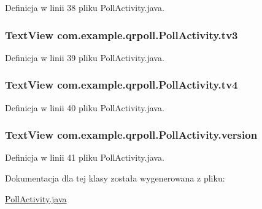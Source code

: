 Definicja w linii 38 pliku Poll\+Activity.\+java.

\hypertarget{classcom_1_1example_1_1qrpoll_1_1_poll_activity_a70708751ea7eb8a32569447a087471b8}{
\subsubsection[{tv3}]{\setlength{\rightskip}{0pt plus 5cm}Text\+View com.\+example.\+qrpoll.\+Poll\+Activity.\+tv3\hspace{0.3cm}{\ttfamily [private]}}}\label{classcom_1_1example_1_1qrpoll_1_1_poll_activity_a70708751ea7eb8a32569447a087471b8}


Definicja w linii 39 pliku Poll\+Activity.\+java.

\hypertarget{classcom_1_1example_1_1qrpoll_1_1_poll_activity_a32c7797e7d6cdf269f9449cfdb635438}{
\subsubsection[{tv4}]{\setlength{\rightskip}{0pt plus 5cm}Text\+View com.\+example.\+qrpoll.\+Poll\+Activity.\+tv4\hspace{0.3cm}{\ttfamily [private]}}}\label{classcom_1_1example_1_1qrpoll_1_1_poll_activity_a32c7797e7d6cdf269f9449cfdb635438}


Definicja w linii 40 pliku Poll\+Activity.\+java.

\hypertarget{classcom_1_1example_1_1qrpoll_1_1_poll_activity_a4fbbfc95809c5aa0bf9916316730a992}{
\subsubsection[{version}]{\setlength{\rightskip}{0pt plus 5cm}Text\+View com.\+example.\+qrpoll.\+Poll\+Activity.\+version\hspace{0.3cm}{\ttfamily [private]}}}\label{classcom_1_1example_1_1qrpoll_1_1_poll_activity_a4fbbfc95809c5aa0bf9916316730a992}


Definicja w linii 41 pliku Poll\+Activity.\+java.



Dokumentacja dla tej klasy została wygenerowana z pliku\+:\begin{DoxyCompactItemize}
\item 
\hyperlink{_poll_activity_8java}{Poll\+Activity.\+java}\end{DoxyCompactItemize}
